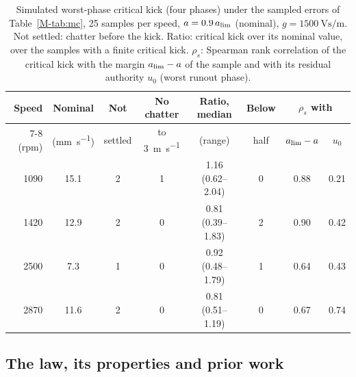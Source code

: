 \begin{table}[!tbp]
\centering
\caption{Simulated worst-phase critical kick (four phases) under the sampled errors of Table~\ref{M-tab:mc}, 25 samples per speed, $a=0.9\,a_{\lim}$ (nominal), $g=\SI{1500}{\volt\second\per\metre}$. Not settled: chatter before the kick. Ratio: critical kick over its nominal value, over the samples with a finite critical kick. $\rho_s$: Spearman rank correlation of the critical kick with the margin $a_{\lim}-a$ of the sample and with its residual authority $u_0$ (worst runout phase).}
\label{tab:mc-kick}
\small
\setlength{\tabcolsep}{4pt}
\begin{tabular}{@{}rccccccc@{}}
\toprule
Speed & Nominal & Not & No chatter & Ratio, median & Below & \multicolumn{2}{c}{$\rho_s$ with}\\
\cmidrule(l){7-8}
(rpm) & (\si{\milli\metre\per\second}) & settled & to \SI{3}{\metre\per\second} & (range) & half & $a_{\lim}-a$ & $u_0$\\
\midrule
1090 & 15.1 & 2 & 1 & 1.16 (0.62--2.04) & 0 & 0.88 & 0.21\\
1420 & 12.9 & 2 & 0 & 0.81 (0.39--1.83) & 2 & 0.90 & 0.42\\
2500 & 7.3  & 1 & 0 & 0.92 (0.48--1.79) & 1 & 0.64 & 0.43\\
2870 & 11.6 & 2 & 0 & 0.81 (0.51--1.19) & 0 & 0.67 & 0.74\\
\bottomrule
\end{tabular}
\end{table}

\subsection{The law, its properties and prior work}\label{supp:delayed-prior}

